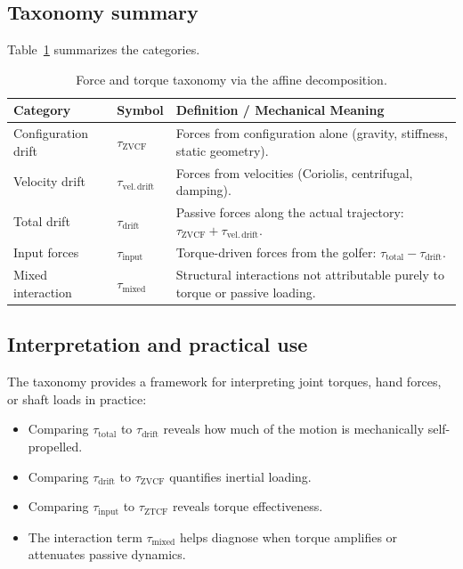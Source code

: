 \documentclass[12pt]{article}
\begin{document}
\subsection{Taxonomy summary}

Table~\ref{tab:taxonomy} summarizes the categories.

\begin{table}[h]
  \centering
  \caption{Force and torque taxonomy via the affine decomposition.}
  \label{tab:taxonomy}
  \begin{tabular}{llp{7.5cm}}
    \toprule
    Category & Symbol & Definition / Mechanical Meaning \\
    \midrule
    Configuration drift & \(\tau_{\mathrm{ZVCF}}\) &
      Forces from configuration alone (gravity, stiffness, static geometry). \\
    Velocity drift & \(\tau_{\mathrm{vel.\,drift}}\) &
      Forces from velocities (Coriolis, centrifugal, damping). \\
    Total drift & \(\tau_{\text{drift}}\) &
      Passive forces along the actual trajectory: \(\tau_{\mathrm{ZVCF}} + \tau_{\mathrm{vel.\,drift}}\). \\
    Input forces & \(\tau_{\mathrm{input}}\) &
      Torque-driven forces from the golfer: \(\tau_{\text{total}} - \tau_{\text{drift}}\). \\
    Mixed interaction & \(\tau_{\mathrm{mixed}}\) &
      Structural interactions not attributable purely to torque or passive loading. \\
    \bottomrule
  \end{tabular}
\end{table}

\subsection{Interpretation and practical use}

The taxonomy provides a framework for interpreting joint torques, hand forces, or shaft loads in practice:
\begin{itemize}
  \item Comparing \(\tau_{\text{total}}\) to \(\tau_{\mathrm{drift}}\) reveals how much of the motion is mechanically self-propelled.
  \item Comparing \(\tau_{\mathrm{drift}}\) to \(\tau_{\mathrm{ZVCF}}\) quantifies inertial loading.
  \item Comparing \(\tau_{\mathrm{input}}\) to \(\tau_{\mathrm{ZTCF}}\) reveals torque effectiveness.
  \item The interaction term \(\tau_{\mathrm{mixed}}\) helps diagnose when torque amplifies or attenuates passive dynamics.
\end{itemize}
\end{document}
